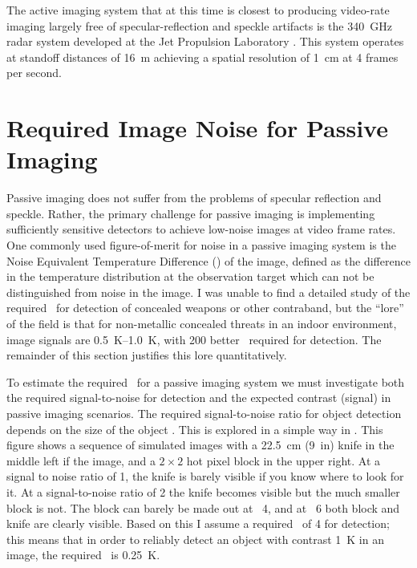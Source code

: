 The active imaging system that at this time is closest to producing video-rate imaging largely free of specular-reflection and speckle artifacts is the \SI{340}{\GHz} radar system developed at the Jet Propulsion Laboratory \cite{cooper_thz_2011}.
This system operates at standoff distances of \SI{16}{\m} achieving a spatial resolution of \SI{1}{\cm} at 4 frames per second.

\section{Required Image Noise for Passive Imaging} \label{sec:ch1-netd-reqs}

Passive imaging does not suffer from the problems of specular reflection and speckle.
Rather, the primary challenge for passive imaging is implementing sufficiently sensitive detectors to achieve low-noise images at video frame rates.
One commonly used figure-of-merit for noise in a passive imaging system is the Noise Equivalent Temperature Difference (\NETD) of the image, defined as the difference in the temperature distribution at the observation target which can not be distinguished from noise in the image.
I was unable to find a detailed study of the required \NETD\ for detection of concealed weapons or other contraband, but the ``lore'' of the field is that for non-metallic concealed threats in an indoor environment, image signals are \SIrange{0.5}{1.0}{\K}, with \SI{200}{\mK}  better \NETD\ required for detection.
The remainder of this section justifies this lore quantitatively.

To estimate the required \NETD\ for a passive imaging system we must investigate both the required signal-to-noise for detection and the expected contrast (signal) in passive imaging scenarios.
The required signal-to-noise ratio for object detection depends on the size of the object \cite{steven_w._smith_scientist_1997}.
This is explored in a simple way in .
This figure shows a sequence of simulated images with a \SI{22.5}{\cm} (\SI{9}{in}) knife in the middle left if the image, and a $2\times2$ hot pixel block in the upper right.
At a signal to noise ratio of 1, the knife is barely visible if you know where to look for it.
At a signal-to-noise ratio of 2 the knife becomes visible but the much smaller block is not.
The block can barely be made out at \SN\ 4, and at \SN\ 6 both block and knife are clearly visible.
Based on this I assume a required \SN\  of 4 for detection; this means that in order to reliably detect an object with contrast \SI{1}{\K} in an image, the required \NETD\ is \SI{0.25}{\K}.


